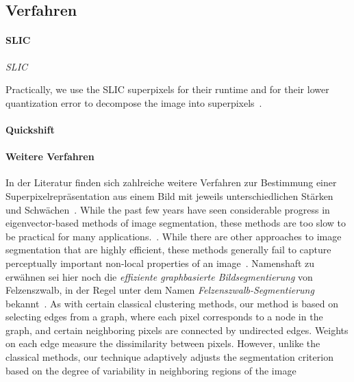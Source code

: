 \subsection{Verfahren}
\label{superpixel_verfahren}

\paragraph{SLIC}
\label{slic}

\emph{\gls{SLIC}}~\cite{slic}

Practically, we use the SLIC superpixels for their runtime and for their lower quantization error to decompose the image into superpixels~\cite{Gadde}.

\paragraph{Quickshift}
\label{quickshift}

\cite{quickshift}

\paragraph{Weitere Verfahren}
\label{weitere_superpixel_verfahren}

In der Literatur finden sich zahlreiche weitere Verfahren zur Bestimmung einer Superpixelrepräsentation aus einem Bild mit jeweils unterschiedlichen Stärken und Schwächen~\cite{super, slic}.
While the past few years have seen considerable progress in eigenvector-based
methods of image segmentation, these methods are too slow to be
practical for many applications.~\cite{felzenszwalb}.
While there are other approaches to image segmentation that are highly efficient, these
methods generally fail to capture perceptually important non-local properties of an
image~\cite{felzenszwalb}.
Namenshaft zu erwähnen sei hier noch die \emph{effiziente graphbasierte Bildsegmentierung} von Felzenszwalb, in der Regel unter dem Namen \emph{Felzenszwalb-Segmentierung} bekannt~\cite{felzenszwalb}.
As with certain classical clustering methods, our method is based on
selecting edges from a graph, where each pixel corresponds to a node in the graph,
and certain neighboring pixels are connected by undirected edges. Weights on each
edge measure the dissimilarity between pixels. However, unlike the classical methods,
our technique adaptively adjusts the segmentation criterion based on the degree of
variability in neighboring regions of the image~\cite{felzenszwalb}
